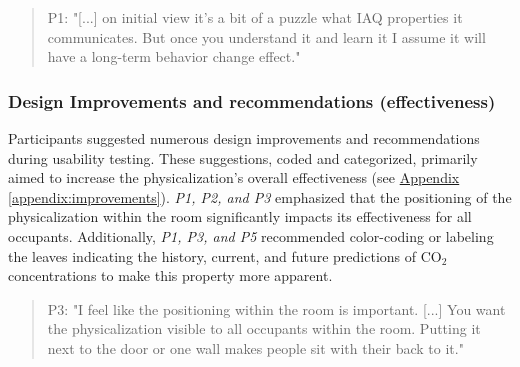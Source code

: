 \begin{quote}
P1: "[...] on initial view it's a bit of a puzzle what IAQ properties it communicates. But once you understand it and learn it I assume it will have a long-term behavior change effect."
\end{quote}


\subsubsection{Design Improvements and recommendations (effectiveness)}

Participants suggested numerous design improvements and recommendations during usability testing. These suggestions, coded and categorized, primarily aimed to increase the physicalization's overall effectiveness (see \hyperref[appendix:improvements]{Appendix \ref*{appendix:improvements}}). \textit{P1, P2, and P3 } emphasized that the positioning of the physicalization within the room significantly impacts its effectiveness for all occupants. Additionally, \textit{P1, P3, and P5} recommended color-coding or labeling the leaves indicating the history, current, and future predictions of CO$_{2}$ concentrations to make this property more apparent.

\begin{quote}
P3: "I feel like the positioning within the room is important. [...] You want the physicalization visible to all occupants within the room. Putting it next to the door or one wall makes people sit with their back to it."
\end{quote}